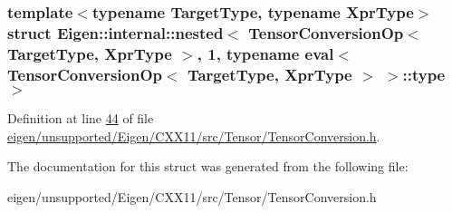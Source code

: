 \subsubsection*{template$<$typename Target\+Type, typename Xpr\+Type$>$\newline
struct Eigen\+::internal\+::nested$<$ Tensor\+Conversion\+Op$<$ Target\+Type, Xpr\+Type $>$, 1, typename eval$<$ Tensor\+Conversion\+Op$<$ Target\+Type, Xpr\+Type $>$ $>$\+::type $>$}



Definition at line \hyperlink{eigen_2unsupported_2_eigen_2_c_x_x11_2src_2_tensor_2_tensor_conversion_8h_source_l00044}{44} of file \hyperlink{eigen_2unsupported_2_eigen_2_c_x_x11_2src_2_tensor_2_tensor_conversion_8h_source}{eigen/unsupported/\+Eigen/\+C\+X\+X11/src/\+Tensor/\+Tensor\+Conversion.\+h}.



The documentation for this struct was generated from the following file\+:\begin{DoxyCompactItemize}
\item 
eigen/unsupported/\+Eigen/\+C\+X\+X11/src/\+Tensor/\+Tensor\+Conversion.\+h\end{DoxyCompactItemize}
